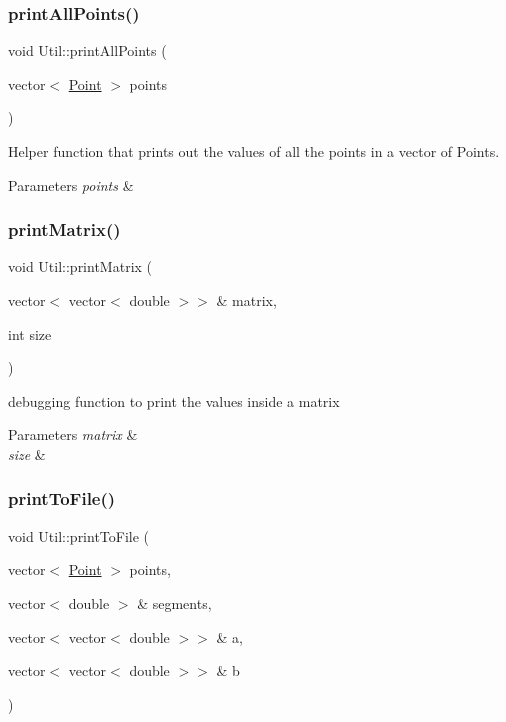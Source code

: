 \subsubsection{\texorpdfstring{print\+All\+Points()}{printAllPoints()}}
{\footnotesize\ttfamily void Util\+::print\+All\+Points (\begin{DoxyParamCaption}\item[{vector$<$ \hyperlink{classPoint}{Point} $>$}]{points }\end{DoxyParamCaption})}



Helper function that prints out the values of all the points in a vector of Points. 


\begin{DoxyParams}{Parameters}
{\em points} & \\
\hline
\end{DoxyParams}
\mbox{\label{classUtil_a28d918079aea7f09487b7636f8fd4c1e}} 
\subsubsection{\texorpdfstring{print\+Matrix()}{printMatrix()}}
{\footnotesize\ttfamily void Util\+::print\+Matrix (\begin{DoxyParamCaption}\item[{vector$<$ vector$<$ double $>$$>$ \&}]{matrix,  }\item[{int}]{size }\end{DoxyParamCaption})}



debugging function to print the values inside a matrix 


\begin{DoxyParams}{Parameters}
{\em matrix} & \\
\hline
{\em size} & \\
\hline
\end{DoxyParams}
\mbox{\label{classUtil_a301898b592f7bd987cb56a57cbbe2e92}} 
\subsubsection{\texorpdfstring{print\+To\+File()}{printToFile()}}
{\footnotesize\ttfamily void Util\+::print\+To\+File (\begin{DoxyParamCaption}\item[{vector$<$ \hyperlink{classPoint}{Point} $>$}]{points,  }\item[{vector$<$ double $>$ \&}]{segments,  }\item[{vector$<$ vector$<$ double $>$$>$ \&}]{a,  }\item[{vector$<$ vector$<$ double $>$$>$ \&}]{b }\end{DoxyParamCaption})}



